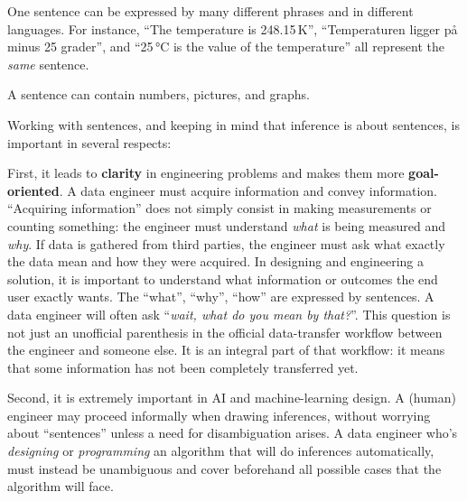 \documentclass[
  a4paper,
  DIV=11,
  numbers=noendperiod,
  oneside]{scrreprt}
\begin{document}

One sentence can be expressed by many different phrases and in different
languages. For instance, ``{The temperature is 248.15\,K}'',
``{Temperaturen ligger på minus 25 grader}'', and ``{25\,°C is the value
of the temperature}'' all represent the \emph{same} sentence.

A sentence can contain numbers, pictures, and graphs.

Working with sentences, and keeping in mind that inference is about
sentences, is important in several respects:

First, it leads to \textbf{clarity} in engineering problems and makes
them more \textbf{goal-oriented}. A data engineer must acquire
information and convey information. ``Acquiring information'' does not
simply consist in making measurements or counting something: the
engineer must understand \emph{what} is being measured and \emph{why}.
If data is gathered from third parties, the engineer must ask what
exactly the data mean and how they were acquired. In designing and
engineering a solution, it is important to understand what information
or outcomes the end user exactly wants. The ``what'', ``why'', ``how''
are expressed by sentences. A data engineer will often ask ``\emph{wait,
what do you mean by that?}''. This question is not just an unofficial
parenthesis in the official data-transfer workflow between the engineer
and someone else. It is an integral part of that workflow: it means that
some information has not been completely transferred yet.

Second, it is extremely important in AI and machine-learning design. A
(human) engineer may proceed informally when drawing inferences, without
worrying about ``sentences'' unless a need for disambiguation arises. A
data engineer who's \emph{designing} or \emph{programming} an algorithm
that will do inferences automatically, must instead be unambiguous and
cover beforehand all possible cases that the algorithm will face.
\end{document}
